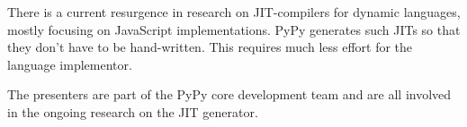 \documentclass{llncs}
\begin{document}
There is a current resurgence in research on JIT-compilers for dynamic
languages, mostly focusing on JavaScript implementations. PyPy generates such
JITs so that they don't have to be hand-written. This requires much less effort
for the language implementor.

The presenters are part of the PyPy core development team and are all involved
in the ongoing research on the JIT generator. 



\end{document}
